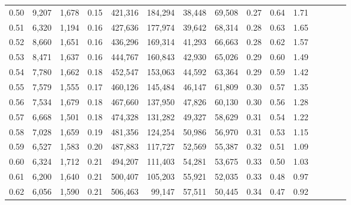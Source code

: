 \begin{tabular}{rrrcrrrrrrrrrrr}
0.50 &   9,207 &  1,678 &                                       0.15 &  421,316 &  184,294 &   38,448 &   69,508 &  0.27 &  0.64 &                         1.71 \\
0.51 &   6,320 &  1,194 &                                       0.16 &  427,636 &  177,974 &   39,642 &   68,314 &  0.28 &  0.63 &                         1.65 \\
0.52 &   8,660 &  1,651 &                                       0.16 &  436,296 &  169,314 &   41,293 &   66,663 &  0.28 &  0.62 &                         1.57 \\
0.53 &   8,471 &  1,637 &                                       0.16 &  444,767 &  160,843 &   42,930 &   65,026 &  0.29 &  0.60 &                         1.49 \\
0.54 &   7,780 &  1,662 &                                       0.18 &  452,547 &  153,063 &   44,592 &   63,364 &  0.29 &  0.59 &                         1.42 \\
0.55 &   7,579 &  1,555 &                                       0.17 &  460,126 &  145,484 &   46,147 &   61,809 &  0.30 &  0.57 &                         1.35 \\
0.56 &   7,534 &  1,679 &                                       0.18 &  467,660 &  137,950 &   47,826 &   60,130 &  0.30 &  0.56 &                         1.28 \\
0.57 &   6,668 &  1,501 &                                       0.18 &  474,328 &  131,282 &   49,327 &   58,629 &  0.31 &  0.54 &                         1.22 \\
0.58 &   7,028 &  1,659 &                                       0.19 &  481,356 &  124,254 &   50,986 &   56,970 &  0.31 &  0.53 &                         1.15 \\
0.59 &   6,527 &  1,583 &                                       0.20 &  487,883 &  117,727 &   52,569 &   55,387 &  0.32 &  0.51 &                         1.09 \\
0.60 &   6,324 &  1,712 &                                       0.21 &  494,207 &  111,403 &   54,281 &   53,675 &  0.33 &  0.50 &                         1.03 \\
0.61 &   6,200 &  1,640 &                                       0.21 &  500,407 &  105,203 &   55,921 &   52,035 &  0.33 &  0.48 &                         0.97 \\
0.62 &   6,056 &  1,590 &                                       0.21 &  506,463 &   99,147 &   57,511 &   50,445 &  0.34 &  0.47 &                         0.92 \\

\end{tabular}
